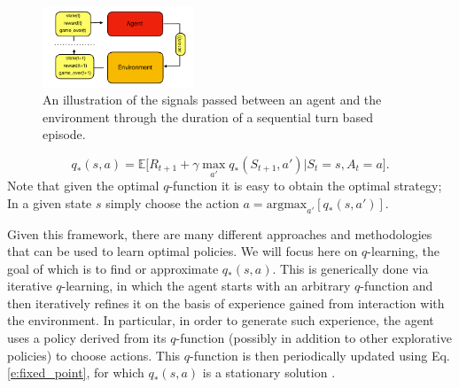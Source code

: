 \documentclass[twocolumn,preprintnumbers,amsmath,amssymb,notitlepage,nofootinbib,longbibliography,superscriptaddress,aps,pra,10pt]{revtex4-1}
\begin{document}
	\begin{figure}
		\centering
		\includegraphics[width=0.4\textwidth]{figures/agent_environment.pdf}
		\caption{
			An illustration of the signals passed between an agent and the environment through the duration of a sequential turn based episode.
		}
		\label{f:agent_environment}
	\end{figure}

	\begin{equation}\label{e:fixed_point}
		q_*(s,a) = \mathbb{E}\big[R_{t+1} + \gamma\max_{a'}q_{*}(S_{t+1},a')\big|S_t = s, A_t = a \big].
	\end{equation}
	Note that given the optimal $q$-function it is easy to obtain the optimal strategy; In a given state $s$ simply choose the action $a = \mathrm{argmax}_{a'}[q_*(s,a')]$.

	Given this framework, there are many different approaches and methodologies that can be used to learn optimal policies.
	We will focus here on $q$-learning, the goal of which is to find or approximate $q_*(s,a)$.
	This is generically done via iterative $q$-learning, in which the agent starts with an arbitrary $q$-function and then iteratively refines it on the basis of experience gained from interaction with the environment.
	In particular, in order to generate such experience, the agent uses a policy derived from its $q$-function (possibly in addition to other explorative policies) to choose actions.
	This $q$-function is then periodically updated using Eq. \eqref{e:fixed_point}, for which $q_*(s,a)$ is a stationary solution \cite{RLSutton18}.
\end{document}

